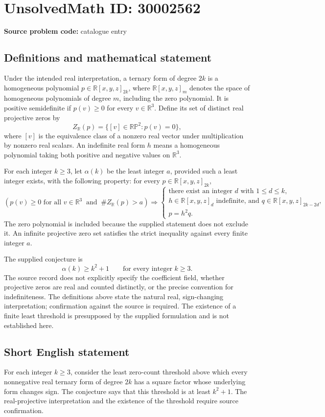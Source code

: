 \documentclass[11pt]{article}
\newcommand{\R}{\mathbb{R}}
\begin{document}
\section*{UnsolvedMath ID: 30002562}
\textbf{Source problem code:} catalogue entry
\subsection{Definitions and mathematical statement}
Under the intended real interpretation, a ternary form of degree \(2k\) is a homogeneous polynomial \(p\in\R[x,y,z]_{2k}\), where \(\R[x,y,z]_m\) denotes the space of homogeneous polynomials of degree \(m\), including the zero polynomial. It is positive semidefinite if \(p(v)\geq0\) for every \(v\in\R^3\). Define its set of distinct real projective zeros by
\[
Z_{\R}(p)=\{[v]\in\mathbb{RP}^{2}:p(v)=0\},
\]
where \([v]\) is the equivalence class of a nonzero real vector under multiplication by nonzero real scalars. An indefinite real form \(h\) means a homogeneous polynomial taking both positive and negative values on \(\R^3\).

For each integer \(k\geq3\), let \(\alpha(k)\) be the least integer \(a\), provided such a least integer exists, with the following property: for every \(p\in\R[x,y,z]_{2k}\),
\[
\left(p(v)\geq0\text{ for all }v\in\R^3\ \text{ and }\ \#Z_{\R}(p)>a\right)
\Longrightarrow
\left\{
\begin{gathered}
\text{there exist an integer }d\text{ with }1\leq d\leq k,\\
h\in\R[x,y,z]_d\text{ indefinite, and }q\in\R[x,y,z]_{2k-2d},\\
p=h^2q.
\end{gathered}
\right.
\]
The zero polynomial is included because the supplied statement does not exclude it. An infinite projective zero set satisfies the strict inequality against every finite integer \(a\).

The supplied conjecture is
\[
\alpha(k)\geq k^2+1\qquad\text{for every integer }k\geq3.
\]
The source record does not explicitly specify the coefficient field, whether projective zeros are real and counted distinctly, or the precise convention for indefiniteness. The definitions above state the natural real, sign-changing interpretation; confirmation against the source is required. The existence of a finite least threshold is presupposed by the supplied formulation and is not established here.
\subsection{Short English statement}
For each integer \(k\geq3\), consider the least zero-count threshold above which every nonnegative real ternary form of degree \(2k\) has a square factor whose underlying form changes sign. The conjecture says that this threshold is at least \(k^2+1\). The real-projective interpretation and the existence of the threshold require source confirmation.
\end{document}
